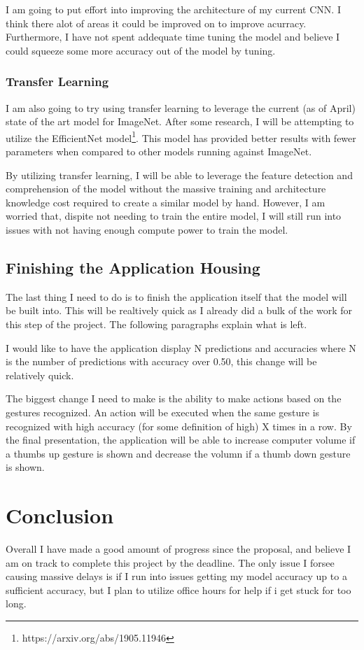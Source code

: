 \documentclass[9pt]{article}
\begin{document}
I am going to put effort into improving the architecture of my current CNN. I think there alot of areas it could be improved on to improve acurracy. Furthermore, I have not spent addequate time tuning the model and believe I could squeeze some more accuracy out of the model by tuning. 

\subsubsection{Transfer Learning}

I am also going to try using transfer learning to leverage the current (as of April) state of the art model for ImageNet. After some research, I will be attempting to utilize the EfficientNet model\footnote{https://arxiv.org/abs/1905.11946}. This model has provided better results with fewer parameters when compared to other models running against ImageNet. 

By utilizing transfer learning, I will be able to leverage the feature detection and comprehension of the model without the massive training and architecture knowledge cost required to create a similar model by hand. However, I am worried that, dispite not needing to train the entire model, I will still run into issues with not having enough compute power to train the model.

\subsection{Finishing the Application Housing}

The last thing I need to do is to finish the application itself that the model will be built into. This will be realtively quick as I already did a bulk of the work for this step of the project. The following paragraphs explain what is left.

I would like to have the application display N predictions and accuracies where N is the number of predictions with accuracy over 0.50, this change will be relatively quick. 

The biggest change I need to make is the ability to make actions based on the gestures recognized. An action will be executed when the same gesture is recognized with high accuracy (for some definition of high) X times in a row. By the final presentation, the application will be able to increase computer volume if a thumbs up gesture is shown and decrease the volumn if a thumb down gesture is shown.

\section{Conclusion}
Overall I have made a good amount of progress since the proposal, and believe I am on track to complete this project by the deadline. The only issue I forsee causing massive delays is if I run into issues getting my model accuracy up to a sufficient accuracy, but I plan to utilize office hours for help if i get stuck for too long.
\end{document}
